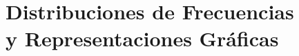 
\chapter[Distribuciones de Frecuencias y Representaciones Gráficas]{Distribuciones de Frecuencias\\ y Representaciones Gráficas}\label{cap:distribuciones-frecuencias}









